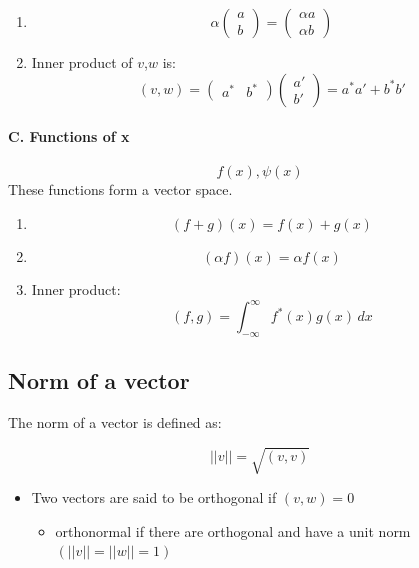 \documentclass[a4paper,11pt,normalem]{article}
\begin{document}
\begin{enumerate}
\item
  \[\alpha\begin{pmatrix} a \\ b\end{pmatrix} = \begin{pmatrix} \alpha a \\ \alpha b \end{pmatrix}\]
\item
  Inner product of \(v\),\(w\) is: \[
  (v,w) = \begin{pmatrix} a^* & b^* \end{pmatrix}\begin{pmatrix} a' \\ b' \end{pmatrix} = a^* a' + b^* b'
  \]
\end{enumerate}

\paragraph{C. Functions of x}\label{c.-functions-of-x}

\[
    f(x), \psi(x)
\]
These functions form a vector space.

\begin{enumerate}
\item
  \[(f + g)(x) = f(x) + g(x)\]
\item
  \[(\alpha f)(x) = \alpha f(x)\]
\item
  Inner product: \[
  (f, g) = \int_{-\infty}^{\infty} f^* (x)g(x)\,dx
  \]
\end{enumerate}

\subsection{Norm of a vector}\label{norm-of-a-vector}

The norm of a vector is defined as:

\[
    ||v|| = \sqrt{(v,v)}
\]

\begin{itemize}
\item
  Two vectors are said to be orthogonal if \((v,w) = 0\)
  \begin{itemize}
  \item
    orthonormal if there are orthogonal and have a unit norm
    \((||v|| = ||w|| = 1)\)
  \end{itemize}
\end{itemize}

\section{}\label{lecture-3}
\end{document}
